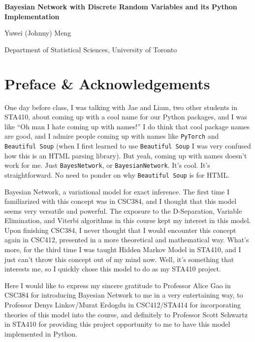 \documentclass{article}
\theoremstyle{definition}
\begin{document}
\begin{titlepage}
    \centering
    \vspace*{3cm}
    {\huge \bfseries Bayesian Network with Discrete Random Variables and its Python Implementation \par}
    \vspace{5cm}
    {\Large Yuwei (Johnny) Meng \par}
    \vspace{3cm}
    {\large Department of Statistical Sciences, University of Toronto}
    \vfill
\end{titlepage}

\tableofcontents

\pagebreak

\section{Preface \& Acknowledgements}

One day before class, I was talking with Jae and Liam, two other students in STA410, about coming up with a cool name for our Python packages, and I was like ``Oh man I hate coming up with names!'' I do think that cool package names are good, and I admire people coming up with names like \texttt{PyTorch} and \texttt{Beautiful Soup} (when I first learned to use \texttt{Beautiful Soup} I was very confused how this is an HTML parsing library). But yeah, coming up with names doesn't work for me. Just \texttt{BayesNetwork}, or \texttt{BayesianNetwork}. It's cool. It's straightforward. No need to ponder on why \texttt{Beautiful Soup} is for HTML.

Bayesian Network, a variational model for exact inference. The first time I familiarized with this concept was in CSC384, and I thought that this model seems very versatile and powerful. The exposure to the D-Separation, Variable Elimination, and Viterbi algorithms in this course kept my interest in this model. Upon finishing CSC384, I never thought that I would encounter this concept again in CSC412, presented in a more theoretical and mathematical way. What's more, for the third time I was taught Hidden Markov Model in STA410, and I just can't throw this concept out of my mind now. Well, it's something that interests me, so I quickly chose this model to do as my STA410 project.

Here I would like to express my sincere gratitude to Professor Alice Gao in CSC384 for introducing Bayesian Network to me in a very entertaining way, to Professor Denys Linkov/Murat Erdogdu in CSC412/STA414 for incorporating theories of this model into the course, and definitely to Professor Scott Schwartz in STA410 for providing this project opportunity to me to have this model implemented in Python.
\end{document}
